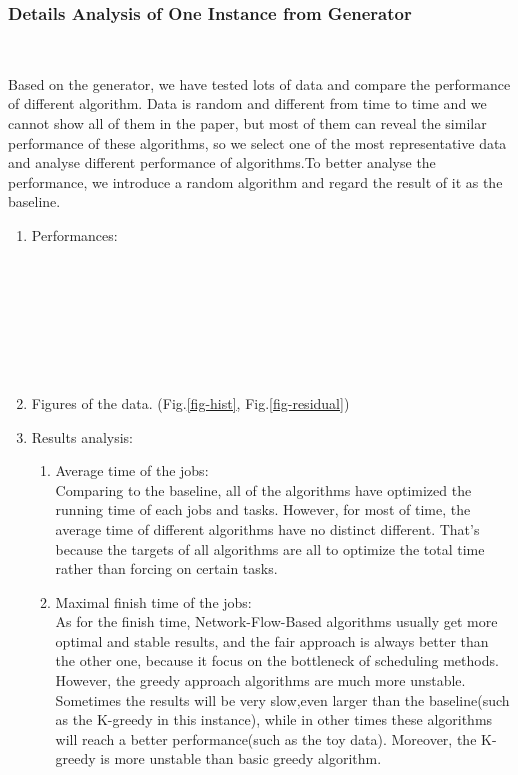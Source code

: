 \subsubsection{Details Analysis of One Instance from Generator}
~\par
Based on the generator, we have tested lots of data and compare the performance of different algorithm. Data is random and different from time to time and we cannot show all of them in the paper, but most of them can reveal the similar performance of these algorithms, so we select one of the most representative data and analyse different performance of algorithms.To better analyse the performance, we introduce a random algorithm and regard the result of it as the baseline.
\begin{enumerate}
    \item Performances:~\par~\par
    
    ~\par~\par~\par
    \item Figures of the data. (Fig.\ref{fig-hist}, Fig.\ref{fig-residual})
    ~\par
    
    
    \item Results analysis:
    \begin{enumerate}
        \item Average time of the jobs:\\
        Comparing to the baseline, all of the algorithms have optimized the running time of each jobs and tasks. However, for most of time, the average time of different algorithms have no distinct different. That's because the targets of all algorithms are all to optimize the total time rather than forcing on certain tasks.
        \item Maximal finish time of the jobs:\\
        As for the finish time, Network-Flow-Based algorithms usually get more optimal and stable results, and the fair approach is always better than the other one, because it focus on the bottleneck of scheduling methods.\\
        However, the greedy approach algorithms are much more unstable. Sometimes the results will be very slow,even larger than the baseline(such as the K-greedy in this instance), while in other times these algorithms will reach a better performance(such as the toy data). Moreover, the K-greedy is more unstable than basic greedy algorithm.\\

\end{enumerate}
\end{enumerate}

